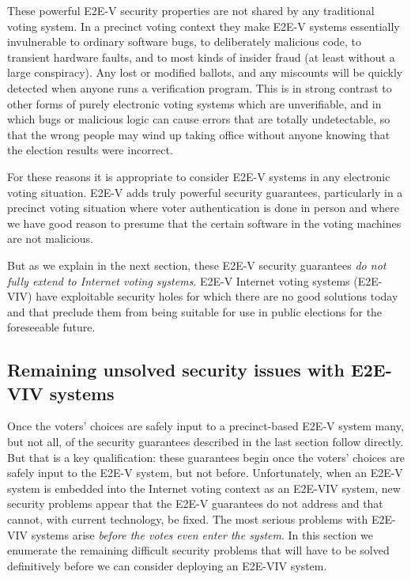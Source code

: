 These powerful E2E-V security properties are not shared by any
traditional voting system. In a precinct voting context they make
E2E-V systems essentially invulnerable to ordinary software bugs, to
deliberately malicious code, to transient hardware faults, and to most
kinds of insider fraud (at least without a large conspiracy). Any lost
or modified ballots, and any miscounts will be quickly detected when
anyone runs a verification program. This is in strong contrast to
other forms of purely electronic voting systems which are
unverifiable, and in which bugs or malicious logic can cause errors
that are totally undetectable, so that the wrong people may wind up
taking office without anyone knowing that the election results were
incorrect.

For these reasons it is appropriate to consider E2E-V systems in any
electronic voting situation. E2E-V adds truly powerful security
guarantees, particularly in a precinct voting situation where voter
authentication is done in person and where we have good reason to
presume that the certain software in the voting machines are not
malicious.

But as we explain in the next section, these E2E-V security guarantees
\emph{do not fully extend to Internet voting systems}. E2E-V Internet
voting systems (E2E-VIV) have exploitable security holes for which
there are no good solutions today and that preclude them from being
suitable for use in public elections for the foreseeable future.
  
\subsection{Remaining unsolved security issues with E2E-VIV systems}

Once the voters' choices are safely input to a precinct-based E2E-V
system many, but not all, of the security guarantees described in the
last section follow directly. But that is a key qualification: these
guarantees begin once the voters' choices are safely input to the
E2E-V system, but not before. Unfortunately, when an E2E-V system is
embedded into the Internet voting context as an E2E-VIV system, new
security problems appear that the E2E-V guarantees do not address and
that cannot, with current technology, be fixed. The most serious
problems with E2E-VIV systems arise \emph{before the votes even enter
  the system}. In this section we enumerate the remaining difficult
security problems that will have to be solved definitively before we
can consider deploying an E2E-VIV system.

